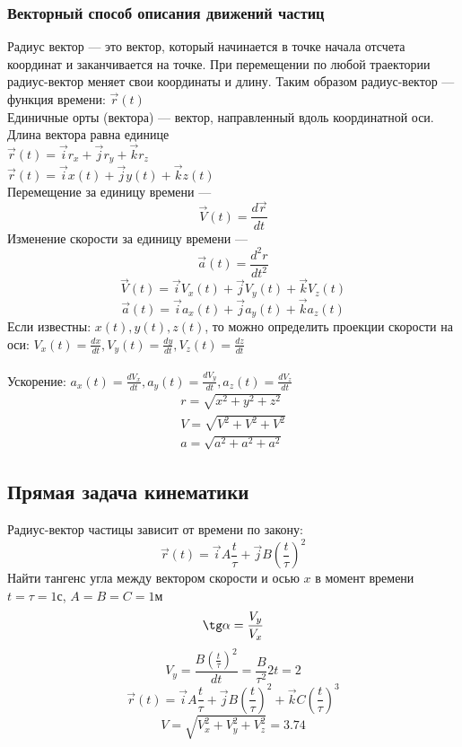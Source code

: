 \documentclass[a4paper, 12pt, oneside]{article}
\begin{document}
\subsubsection{Векторный способ описания движений частиц}
Радиус вектор --- это вектор, который начинается в точке начала отсчета координат и заканчивается на точке. При перемещении по любой траектории радиус-вектор меняет свои координаты и длину. Таким образом радиус-вектор --- функция времени: $\overrightarrow{r}(t)$\\
Единичные орты (вектора) --- вектор, направленный вдоль координатной оси. Длина вектора равна единице\\
$\overrightarrow{r}(t)=\overrightarrow{i} r_x+\overrightarrow{j} r_y+\overrightarrow{k} r_z$\\
$\overrightarrow{r}(t)=\overrightarrow{i} x(t)+\overrightarrow{j} y(t)+\overrightarrow{k} z(t)$\\

Перемещение за единицу времени ---
$$
	\overrightarrow{V}(t)=\frac{d\overrightarrow{r}}{dt}
$$
Изменение скорости за единицу времени ---
$$
	\overrightarrow{a}(t)=\frac{d^2r}{dt^2}
$$
$$
	\overrightarrow{V}(t)=\overrightarrow{i}V_x(t)+\overrightarrow{j}V_y(t)+\overrightarrow{k}V_z(t)
$$
$$
	\overrightarrow{a}(t)=\overrightarrow{i}a_x(t)+\overrightarrow{j}a_y(t)+\overrightarrow{k}a_z(t)
$$
Если известны: $x(t),y(t),z(t)$, то можно определить проекции скорости на оси: $V_x(t)=\frac{dx}{dt}, V_y(t)=\frac{dy}{dt}, V_z(t)=\frac{dz}{dt}$\\\\
Ускорение: $a_x(t)=\frac{dV_x}{dt}, a_y(t)=\frac{dV_y}{dt}, a_z(t)=\frac{dV_z}{dt}$\\
\begin{gather*}
	r=\sqrt{x^2+y^2+z^2}\\
	V=\sqrt{V^2+V^2+V^2}\\
	a=\sqrt{a^2+a^2+a^2}
\end{gather*}
\newpage
\subsection{Прямая задача кинематики}
Радиус-вектор частицы зависит от времени по закону:
$$
\overrightarrow{r}(t)=\overrightarrow{i}A\frac{t}{\tau}+\overrightarrow{j}B(\frac{t}{\tau})^2
$$
Найти тангенс угла между вектором скорости и осью $x$ в момент времени $t=\tau=1с$, $A=B=C=1м$\\
$$
	\tg\alpha = \frac{V_y}{V_x}
$$
$$
	V_y=\frac{B(\frac{t}{\tau})^2}{dt} = \frac{B}{\tau^2}2t=2
$$
$$
\overrightarrow{r}(t)=\overrightarrow{i}A\frac{t}{\tau}+\overrightarrow{j}B(\frac{t}{\tau})^2+\overrightarrow{k}C(\frac{t}{\tau})^3
$$
$$
V=\sqrt{V_x^2+V_y^2+V_z^2}=3.74
$$
\end{document}
